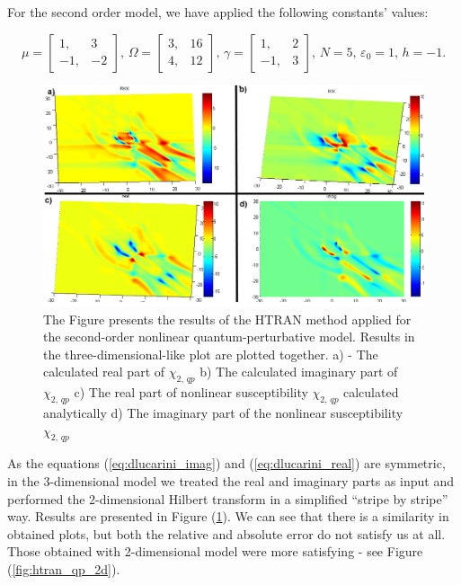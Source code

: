 \documentclass[12pt,twoside,a4paper]{article}
\numberwithin{equation}{subsection}
\numberwithin{figure}{subsection}
\begin{document}
For the second order model, we have applied the following constants' values: 

\begin{equation} \label{eq:htran_qp_constant}
  \mu = \begin{bmatrix}
          1, &  3 \\
         -1, & -2
        \end{bmatrix}, \,
  \Omega = \begin{bmatrix}
          3, & 16 \\
          4, & 12
        \end{bmatrix}, \,
  \gamma = \begin{bmatrix}
          1, & 2 \\
         -1, & 3
        \end{bmatrix}, \,
  N = 5, \,
  \varepsilon_0 = 1, \, 
  h = -1.
\end{equation}

\begin{figure}
  \includegraphics[width=150mm]{img/htran_qp_3d.png}
  \caption{The Figure presents the results of the HTRAN method applied for the second-order nonlinear quantum-perturbative model. Results in the three-dimensional-like plot are plotted together.
     a) - The calculated real part of ${\chi_{2, \, qp}}$ 
     b) The calculated imaginary part of ${\chi_{2, \, qp}}$ 
     c) The real part of nonlinear susceptibility ${\chi_{2, \, qp}}$ calculated analytically 
     d) The imaginary part of the nonlinear susceptibility ${\chi_{2, \, qp}}$
     \label{fig:htran_qp_3d}}
\end{figure}

As the equations (\ref{eq:dlucarini_imag}) and (\ref{eq:dlucarini_real}) are symmetric, in the 3-dimensional model we treated the real and imaginary parts as input and performed the 2-dimensional Hilbert transform in a simplified ``stripe by stripe'' way. Results are presented in Figure (\ref{fig:htran_qp_3d}). We can see that there is a similarity in obtained plots, but both the relative and absolute error do not satisfy us at all. Those obtained with 2-dimensional model were more satisfying - see Figure (\ref{fig:htran_qp_2d}).
\end{document}
